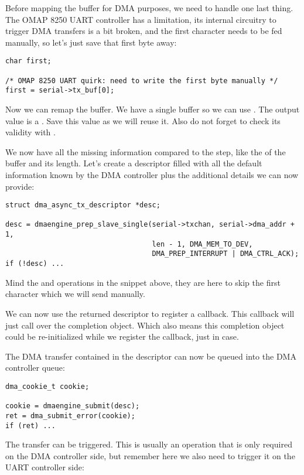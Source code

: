 Before mapping the buffer for DMA purposes, we need to handle one last
thing. The OMAP 8250 UART controller has a limitation, its internal circuitry
to trigger DMA transfers is a bit broken, and the first character needs to be
fed manually, so let's just save that first byte away:

\begin{verbatim}
char first;

/* OMAP 8250 UART quirk: need to write the first byte manually */
first = serial->tx_buf[0];
\end{verbatim}

Now we can remap the buffer. We have a single buffer so we can use
. The output value is a . Save this
value as we will reuse it. Also do not forget to check its validity with
.

We now have all the missing information compared to the 
step, like the  of the buffer and its length. Let's create a
descriptor filled with all the default information known by the DMA controller
plus the additional details we can now provide:

\begin{verbatim}
struct dma_async_tx_descriptor *desc;

desc = dmaengine_prep_slave_single(serial->txchan, serial->dma_addr + 1,
                                   len - 1, DMA_MEM_TO_DEV,
                                   DMA_PREP_INTERRUPT | DMA_CTRL_ACK);
if (!desc) ...
\end{verbatim}

Mind the  and  operations in the snippet above, they are
here to skip the first character which we will send manually.

We can now use the returned descriptor to register a callback. This callback
will just call  over the completion object. Which also means
this completion object could be re-initialized while we register the callback,
just in case.

The DMA transfer contained in the descriptor can now be queued into the DMA
controller queue:

\begin{verbatim}
dma_cookie_t cookie;

cookie = dmaengine_submit(desc);
ret = dma_submit_error(cookie);
if (ret) ...
\end{verbatim}

The transfer can be triggered. This is usually an operation that is only
required on the DMA controller side, but remember here we also need to trigger
it on the UART controller side:

